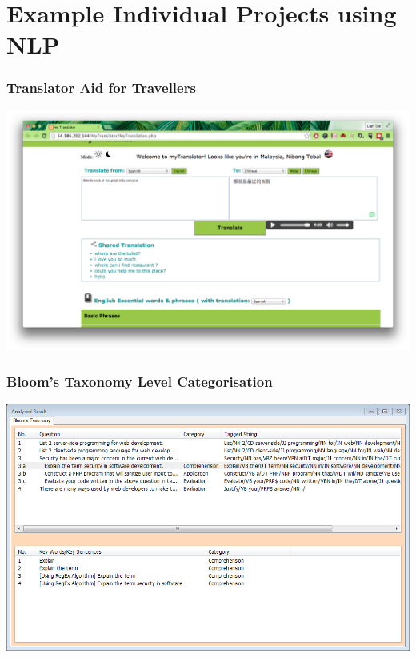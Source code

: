 
\section{Example Individual Projects using NLP}

\begin{frame}
\frametitle{Translator Aid for Travellers}
    
\centering
\includegraphics[width=\textwidth]{mytranslator}

\end{frame}


\begin{frame}
\frametitle{Bloom's Taxonomy Level Categorisation}
    
\centering
\includegraphics[width=\textwidth]{bloom-debug}

\end{frame}


